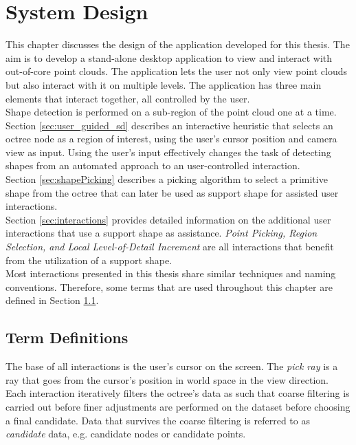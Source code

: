 \chapter{System Design}
\label{chap:systemDesign}

This chapter discusses the design of the application developed for this thesis. The aim is to develop a stand-alone desktop application to view and interact with out-of-core point clouds. The application lets the user not only view point clouds but also interact with it on multiple levels. The application has three main elements that interact together, all controlled by the user. 
\\
Shape detection is performed on a sub-region of the point cloud one at a time. Section \ref{sec:user_guided_sd} describes an interactive heuristic that selects an octree node as a region of interest, using the user's cursor position and camera view as input. Using the user's input effectively changes the task of detecting shapes from an automated approach to an user-controlled interaction.
\\
Section \ref{sec:shapePicking} describes a picking algorithm to select a primitive shape from the octree that can later be used as support shape for assisted user interactions. 
\\
Section \ref{sec:interactions} provides detailed information on the additional user interactions that use a support shape as assistance. \textit{Point Picking, Region Selection, and Local Level-of-Detail Increment} are all interactions that benefit from the utilization of a support shape. 
\\
Most interactions presented in this thesis share similar techniques and naming conventions. Therefore, some terms that are used throughout this chapter are defined in Section \ref{sec:termDefinitions}. 


\section{Term Definitions}
\label{sec:termDefinitions}

The base of all interactions is the user's cursor on the screen. The \textit{pick ray} is a ray that goes from the cursor’s position in world space in the view direction. 
Each interaction iteratively filters the octree's data as such that coarse filtering is carried out before finer adjustments are performed on the dataset before choosing a final candidate. Data that survives the coarse filtering is referred to as \textit{candidate} data, e.g. candidate nodes or candidate points. 



